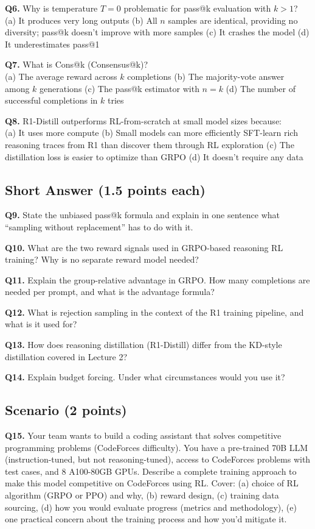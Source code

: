 \documentclass[11pt, a4paper]{article}
\begin{document}
\textbf{Q6.} Why is temperature $T=0$ problematic for pass@k evaluation with $k > 1$?\\
(a) It produces very long outputs\quad
(b) All $n$ samples are identical, providing no diversity; pass@k doesn't improve with more samples\quad
(c) It crashes the model\quad
(d) It underestimates pass@1

\textbf{Q7.} What is Cons@k (Consensus@k)?\\
(a) The average reward across $k$ completions\quad
(b) The majority-vote answer among $k$ generations\quad
(c) The pass@k estimator with $n = k$\quad
(d) The number of successful completions in $k$ tries

\textbf{Q8.} R1-Distill outperforms RL-from-scratch at small model sizes because:\\
(a) It uses more compute\quad
(b) Small models can more efficiently SFT-learn rich reasoning traces from R1 than discover them through RL exploration\quad
(c) The distillation loss is easier to optimize than GRPO\quad
(d) It doesn't require any data

\subsection*{Short Answer (1.5 points each)}

\textbf{Q9.} State the unbiased pass@k formula and explain in one sentence what ``sampling without replacement'' has to do with it.

\textbf{Q10.} What are the two reward signals used in GRPO-based reasoning RL training? Why is no separate reward model needed?

\textbf{Q11.} Explain the group-relative advantage in GRPO. How many completions are needed per prompt, and what is the advantage formula?

\textbf{Q12.} What is rejection sampling in the context of the R1 training pipeline, and what is it used for?

\textbf{Q13.} How does reasoning distillation (R1-Distill) differ from the KD-style distillation covered in Lecture 2?

\textbf{Q14.} Explain budget forcing. Under what circumstances would you use it?

\subsection*{Scenario (2 points)}

\textbf{Q15.} Your team wants to build a coding assistant that solves competitive programming problems (CodeForces difficulty). You have a pre-trained 70B LLM (instruction-tuned, but not reasoning-tuned), access to CodeForces problems with test cases, and 8 A100-80GB GPUs. Describe a complete training approach to make this model competitive on CodeForces using RL. Cover: (a) choice of RL algorithm (GRPO or PPO) and why, (b) reward design, (c) training data sourcing, (d) how you would evaluate progress (metrics and methodology), (e) one practical concern about the training process and how you'd mitigate it.
\end{document}
